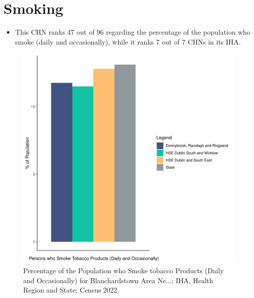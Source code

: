 \documentclass{article}
\begin{document}
\pagebreak

\section{Smoking}\label{sect:Smoking}
\begin{itemize}
\item This CHN ranks  47 out of 96 regarding the percentage of the population who smoke (daily and occasionally), while it ranks   7 out of 7 CHNs in its IHA.
\end{itemize}
\begin{figure}[H]
	\centering
	\includegraphics[width = 120mm]{../figures/SmokingED.pdf}
	\caption{Percentage of the Population who Smoke tobacco Products (Daily and Occasionally) for Blanchardstown Area Ne...; IHA, Health Region and State; Census 2022.}
	\label{fig:2ae19629-1a6a-13a3-e055-000000000001}
	\end{figure}
	
\end{document}
